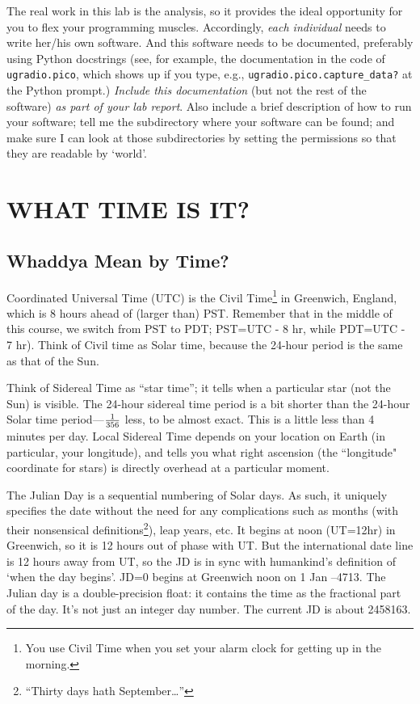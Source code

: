 \documentclass[12pt,preprint]{aastex}
\begin{document}
The real work in this lab is the analysis, so it provides the ideal
opportunity for you to flex your programming muscles. Accordingly, {\it
  each individual} needs to write her/his own software. And this
software needs to be documented, preferably using Python docstrings
(see, for example, the documentation in the code of {\tt ugradio.pico}, which
shows up if you type, e.g., {\tt ugradio.pico.capture\_data?} at the Python prompt.)
{\it Include this
  documentation} (but not the rest of the software) {\it as part of your lab
report}. Also include a brief description of how to run your software;
tell me the subdirectory where your software can be found; and make sure
I can look at those subdirectories by setting the permissions so that
they are readable by `world'. 

\section{WHAT TIME IS IT?} \label{jultime}

\subsection{Whaddya Mean by Time?}

Coordinated Universal Time (UTC) is the Civil Time\footnote{You use
  Civil Time when you set your alarm clock for getting up in the
  morning.} in Greenwich, England, which is 8 hours ahead of (larger
than) PST. Remember that in the middle of this course, we switch from
PST to PDT; PST=UTC - 8 hr, while PDT=UTC - 7 hr). Think of Civil time
as Solar time, because the 24-hour period is the same as that of the
Sun.

Think of Sidereal Time as ``star time''; it tells when a
particular star (not the Sun) is visible. The 24-hour sidereal time period is a
bit shorter than the 24-hour Solar time period---$1 \over 356$ less, to
be almost exact. This is a little less than 4 minutes per day.  Local Sidereal Time
depends on your location on Earth (in particular, your longitude), and tells you
what right ascension (the ``longitude" coordinate for stars) is directly overhead
at a particular moment.

The Julian Day is a sequential numbering of Solar days. As such, it
uniquely specifies the date without the need for any complications such
as months (with their nonsensical definitions\footnote{``Thirty days
  hath September\dots''}), leap years, etc. It begins at noon (UT=12hr)
in Greenwich, so it is 12 hours out of phase with UT. But the
international date line is 12 hours away from UT, so the JD is in sync
with humankind's definition of `when the day begins'. JD=0 begins at
Greenwich noon on 1 Jan --4713.  The Julian day is a double-precision
float: it contains the time as the fractional part of the day. It's not
just an integer day number. The current JD is about 
2458163. %
\end{document}
